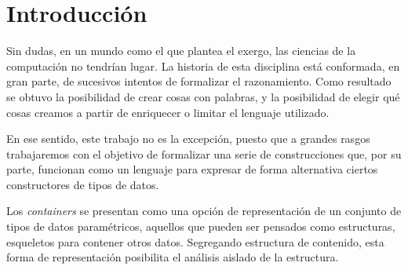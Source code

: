 \chapter*{Introducci\'on}

\begin{epigraphs}
\end{epigraphs} 

Sin dudas, en un mundo como el que plantea el exergo, las ciencias de la computación no tendrían lugar. La historia de esta disciplina está conformada, en gran parte, de sucesivos intentos de formalizar el razonamiento. Como resultado se obtuvo la posibilidad de crear cosas con palabras, y la posibilidad de elegir qué cosas creamos a partir de enriquecer o limitar el lenguaje utilizado.

En ese sentido, este trabajo no es la excepción, puesto que a grandes rasgos trabajaremos con el objetivo de formalizar una serie de construcciones que, por su parte, funcionan como un lenguaje para expresar de forma alternativa ciertos constructores de tipos de datos.

Los {\it containers} se presentan como una opción de representación de un conjunto de tipos de datos paramétricos, aquellos que pueden ser pensados como estructuras, esqueletos para contener otros datos. Segregando estructura de contenido, esta forma de representación posibilita el análisis aislado de la estructura.

